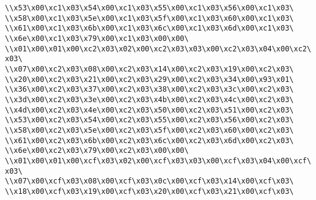 \verb|\\x53\x00\xc1\x03\x54\x00\xc1\x03\x55\x00\xc1\x03\x56\x00\xc1\x03\|\newline
\verb|\\x58\x00\xc1\x03\x5e\x00\xc1\x03\x5f\x00\xc1\x03\x60\x00\xc1\x03\|\newline
\verb|\\x61\x00\xc1\x03\x6b\x00\xc1\x03\x6c\x00\xc1\x03\x6d\x00\xc1\x03\|\newline
\verb|\\x6e\x00\xc1\x03\x79\x00\xc1\x03\x00\x00\|\newline
\verb|\\x01\x00\x01\x00\xc2\x03\x02\x00\xc2\x03\x03\x00\xc2\x03\x04\x00\xc2\x03\|\newline
\verb|\\x07\x00\xc2\x03\x08\x00\xc2\x03\x14\x00\xc2\x03\x19\x00\xc2\x03\|\newline
\verb|\\x20\x00\xc2\x03\x21\x00\xc2\x03\x29\x00\xc2\x03\x34\x00\x93\x01\|\newline
\verb|\\x36\x00\xc2\x03\x37\x00\xc2\x03\x38\x00\xc2\x03\x3c\x00\xc2\x03\|\newline
\verb|\\x3d\x00\xc2\x03\x3e\x00\xc2\x03\x4b\x00\xc2\x03\x4c\x00\xc2\x03\|\newline
\verb|\\x4d\x00\xc2\x03\x4e\x00\xc2\x03\x50\x00\xc2\x03\x51\x00\xc2\x03\|\newline
\verb|\\x53\x00\xc2\x03\x54\x00\xc2\x03\x55\x00\xc2\x03\x56\x00\xc2\x03\|\newline
\verb|\\x58\x00\xc2\x03\x5e\x00\xc2\x03\x5f\x00\xc2\x03\x60\x00\xc2\x03\|\newline
\verb|\\x61\x00\xc2\x03\x6b\x00\xc2\x03\x6c\x00\xc2\x03\x6d\x00\xc2\x03\|\newline
\verb|\\x6e\x00\xc2\x03\x79\x00\xc2\x03\x00\x00\|\newline
\verb|\\x01\x00\x01\x00\xcf\x03\x02\x00\xcf\x03\x03\x00\xcf\x03\x04\x00\xcf\x03\|\newline
\verb|\\x07\x00\xcf\x03\x08\x00\xcf\x03\x0c\x00\xcf\x03\x14\x00\xcf\x03\|\newline
\verb|\\x18\x00\xcf\x03\x19\x00\xcf\x03\x20\x00\xcf\x03\x21\x00\xcf\x03\|\newline
